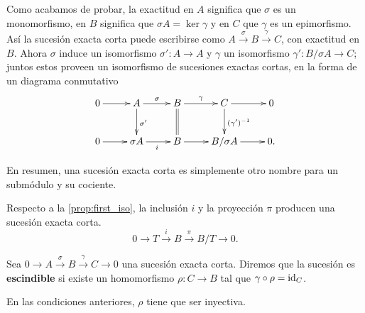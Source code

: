 Como acabamos de probar, la exactitud en \(A\) significa que \(\sigma\) es un monomorfismo, en \(B\) significa que \(\sigma A = \ker \gamma\) y en \(C\) que \(\gamma\) es un epimorfismo. Así la sucesión exacta corta puede escribirse como \(A \xrightarrow{\sigma} B \xrightarrow{\gamma} C\), con exactitud en \(B\). Ahora \(\sigma\) induce un isomorfismo \(\sigma': A \to A\) y \(\gamma\) un isomorfismo \(\gamma': B/\sigma A \to C\); juntos estos proveen un isomorfismo de sucesiones exactas cortas, en la forma de un diagrama conmutativo
\begin{equation}
    \label{exactshortseq-equiv}
    \xymatrix{
    0 \ar[r] & A \ar[r]^{\sigma} \ar[d]^{\sigma'} & B \ar[r]^\gamma \ar@{=}[d] & C \ar[r] \ar[d]^{(\gamma')^{-1}} & 0 \\
    0 \ar[r] & \sigma A \ar[r]_i & B \ar[r] & B/\sigma A \ar[r] & 0.
    }
\end{equation}

En resumen, una sucesión exacta corta es simplemente otro nombre para un submódulo y su cociente.

\begin{ejemplo}
	Respecto a la \autoref{prop:first_iso}, la inclusión \(i\) y la proyección \(\pi\) producen una sucesión exacta corta.
	\[ 0 \rightarrow T \xrightarrow{i} B \xrightarrow{\pi} B/T \rightarrow 0. \]
\end{ejemplo}

\begin{definicion}
	Sea $0 \rightarrow A \xrightarrow{\sigma} B \xrightarrow{\gamma} C \rightarrow 0$ una sucesión exacta corta. Diremos que la sucesión es \textbf{escindible} si existe un homomorfismo $\rho: C \to B$ tal que $\gamma \circ \rho = \operatorname{id}_C$.
\end{definicion}
\begin{observacion}
	En las condiciones anteriores, $\rho$ tiene que ser inyectiva.
\end{observacion}

